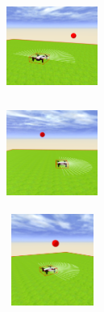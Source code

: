 \begin{figure}[htbp]
\begin{subfigure}[t]{0.2\textwidth}
    \includegraphics[width=3cm, height=3cm]{img/followBallTello1.png}
\label{fig:figure2_1}
\end{subfigure}\hfill
\begin{subfigure}[t]{0.2\textwidth}
  \includegraphics[width=3cm, height=3cm]{img/followBallTello2.png}
\label{fig:figure2_2}
\end{subfigure}\hfill
\begin{subfigure}[t]{0.2\textwidth}
    \includegraphics[width=3cm, height=3cm]{img/followBallTello3.png}
\label{fig:figure2_3}
\end{subfigure}


\end{figure}
